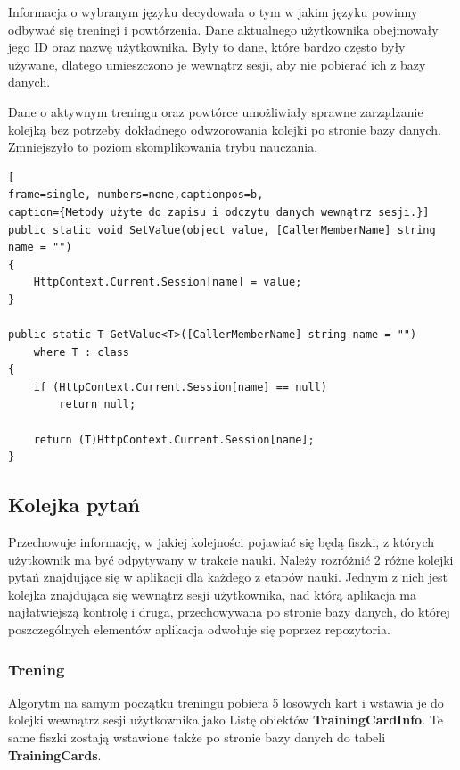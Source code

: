 Informacja o wybranym języku decydowała o tym w jakim języku powinny odbywać się treningi i powtórzenia. 
Dane aktualnego użytkownika obejmowały jego ID oraz nazwę użytkownika. Były to dane, które bardzo często były używane, dlatego umieszczono je wewnątrz sesji, aby nie pobierać ich z bazy danych.

Dane o aktywnym treningu oraz powtórce umożliwiały sprawne zarządzanie kolejką bez potrzeby dokładnego odwzorowania kolejki po stronie bazy danych. Zmniejszyło to poziom skomplikowania trybu nauczania.

\begin{minipage}{\linewidth}
\begin{lstlisting}[
frame=single, numbers=none,captionpos=b, 
caption={Metody użyte do zapisu i odczytu danych wewnątrz sesji.}]
public static void SetValue(object value, [CallerMemberName] string name = "")
{
	HttpContext.Current.Session[name] = value;
}

public static T GetValue<T>([CallerMemberName] string name = "")
	where T : class
{
	if (HttpContext.Current.Session[name] == null)
		return null;

	return (T)HttpContext.Current.Session[name];
}
\end{lstlisting}
\end{minipage}

\subsection{Kolejka pytań}

Przechowuje informację, w jakiej kolejności pojawiać się będą fiszki, z których użytkownik ma być odpytywany w trakcie nauki. Należy rozróżnić 2 różne kolejki pytań znajdujące się w aplikacji dla każdego z etapów nauki. Jednym z nich jest kolejka znajdująca się wewnątrz sesji użytkownika, nad którą aplikacja ma najłatwiejszą kontrolę i druga, przechowywana po stronie bazy danych, do której poszczególnych elementów aplikacja odwołuje się poprzez repozytoria. 

\subsubsection{Trening}

Algorytm na samym początku treningu pobiera 5 losowych kart i wstawia je do kolejki wewnątrz sesji użytkownika jako Listę obiektów \textbf{TrainingCardInfo}. Te same fiszki zostają wstawione także po stronie bazy danych do tabeli \textbf{TrainingCards}. 

